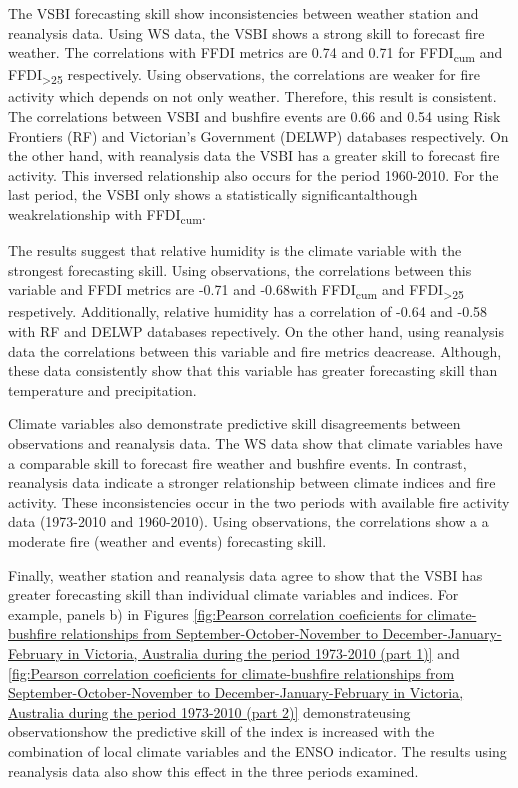 The VSBI forecasting skill show inconsistencies between weather station
and reanalysis data. Using WS data, the VSBI shows a strong skill
to forecast fire weather. The correlations with FFDI metrics are 0.74
and 0.71 for FFDI\textsubscript{cum} and FFDI\textsubscript{>25}
respectively. Using observations, the correlations are weaker for
fire activity which depends on not only weather. Therefore, this result
is consistent. The correlations between VSBI and bushfire events are
0.66 and 0.54 using Risk Frontiers (RF) and Victorian's Government
(DELWP) databases respectively. On the other hand, with reanalysis
data the VSBI has a greater skill to forecast fire activity. This
inversed relationship also occurs for the period 1960-2010. For the
last period, the VSBI only shows a statistically significant\textemdash although
weak\textemdash relationship with FFDI\textsubscript{cum}. 

The results suggest that relative humidity is the climate variable
with the strongest forecasting skill. Using observations, the correlations
between this variable and FFDI metrics are -0.71 and -0.68\textemdash with
FFDI\textsubscript{cum} and FFDI\textsubscript{>25} respetively\textemdash .
Additionally, relative humidity has a correlation of -0.64 and -0.58
with RF and DELWP databases repectively. On the other hand, using
reanalysis data the correlations between this variable and fire metrics
deacrease. Although, these data consistently show that this variable
has greater forecasting skill than temperature and precipitation. 

Climate variables also demonstrate predictive skill disagreements
between observations and reanalysis data. The WS data show that climate
variables have a comparable skill to forecast fire weather and bushfire
events. In contrast, reanalysis data indicate a stronger relationship
between climate indices and fire activity. These inconsistencies occur
in the two periods with available fire activity data (1973-2010 and
1960-2010). Using observations, the correlations show a a moderate
fire (weather and events) forecasting skill. 

Finally, weather station and reanalysis data agree to show that the
VSBI has greater forecasting skill than individual climate variables
and indices. For example, panels b) in Figures \ref{fig:Pearson correlation coeficients for climate-bushfire relationships from September-October-November to December-January-February in Victoria, Australia during the period 1973-2010 (part 1)}
and \ref{fig:Pearson correlation coeficients for climate-bushfire relationships from September-October-November to December-January-February in Victoria, Australia during the period 1973-2010 (part 2)}
demonstrate\textemdash using observations\textemdash how the predictive
skill of the index is increased with the combination of local climate
variables and the ENSO indicator. The results using reanalysis data
also show this effect in the three periods examined.

